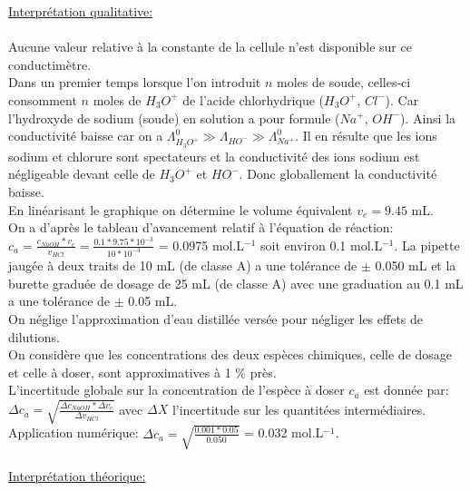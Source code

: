 \documentclass{scrartcl}
\begin{document}
		\noindent\underline{Interprétation qualitative:}\\\\
		Aucune valeur relative à la constante de la cellule n'est disponible sur ce conductimètre.\\
		Dans un premier temps lorsque l'on introduit $n$ moles de soude, celles-ci consomment $n$ moles de $H_3O^+$ de l'acide chlorhydrique ($H_3O^+$, $Cl^-$). Car l'hydroxyde de sodium (soude) en solution a pour formule ($Na^+$, $OH^-$). Ainsi la conductivité baisse car on a $\Lambda_{H_3O^+}^0 \gg \Lambda_{HO^-} \gg \Lambda_{Na^+}^0$. Il en résulte que les ions sodium et chlorure sont spectateurs et la conductivité des ions sodium est négligeable devant celle de $H_3O^+$ et $HO^-$. Donc globallement la conductivité baisse.\\
		En linéarisant le graphique on détermine le volume équivalent $v_e = 9.45$ mL.\\
		On a d'après le tableau d'avancement relatif à l'équation de réaction: $c_a = \frac{c_{NaOH} * v_e}{v_{HCl}} = \frac{0.1 * 9.75 * 10^{-3}}{10 * 10^{-3}}$ = 0.0975 mol.L$^{-1}$ soit environ 0.1 mol.L$^{-1}$. %
		La pipette jaugée à deux traits de 10 mL (de classe A) a une tolérance de $\pm$ 0.050 mL et la burette graduée de dosage de 25 mL (de classe A) avec une graduation au 0.1 mL a une tolérance de $\pm$ 0.05 mL.\\
		On néglige l'approximation d'eau distillée versée pour négliger les effets de dilutions.\\
		On considère que les concentrations des deux espèces chimiques, celle de dosage et celle à doser, sont approximatives à 1 \% près.\\
		L'incertitude globale sur la concentration de l'espèce à doser $c_a$ est donnée par: $\Delta c_a = \sqrt{\frac{\Delta c_{NaOH} * \Delta v_e}{\Delta v_{HCl}}}$ avec $\Delta X$ l'incertitude sur les quantitées intermédiaires.\\ %
		Application numérique: $\Delta c_a = \sqrt{\frac{0.001 * 0.05}{0.050}}$ = 0.032 mol.L$^{-1}$.\\%
		\\
		
		\noindent\underline{Interprétation théorique:}\\\\
		
\end{document}
